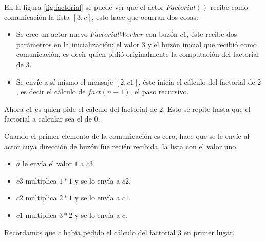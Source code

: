 En la figura \ref{fig:factorial} se puede ver que el actor $Factorial()$ recibe como comunicación la lista $[3,c]$, esto hace que ocurran dos cosas:

\begin{itemize}
\item Se cree un actor nuevo $FactorialWorker$ con buzón $c1$, éste recibe dos parámetros en la inicialización: el valor $3$ y el buzón inicial que recibió como comunicación, es decir quien pidió originalmente la computación del factorial de $3$.

\item Se envíe a sí mismo el mensaje $[2,c1]$, éste inicia el cálculo del factorial de $2$, es decir el cálculo de $fact(n-1)$, el paso recursivo.
\end{itemize}

Ahora $c1$ es quien pide el cálculo del factorial de $2$. Esto se repite hasta que el factorial a calcular sea el de $0$.

Cuando el primer elemento de la comunicación es cero, hace que se le envíe al actor cuya dirección de buzón fue recién recibida, la lista con el valor uno. 

\begin{itemize}
\item $a$ le envía el valor $1$ a $c3$.
\item $c3$ multiplica $1*1$ y se lo envía a $c2$.
\item $c2$ multiplica $2*1$ y se lo envía a $c1$.
\item $c1$ multiplica $3*2$ y se lo envía a $c$.
\end{itemize}

Recordamos que $c$ había pedido el cálculo del factorial $3$ en primer lugar.

